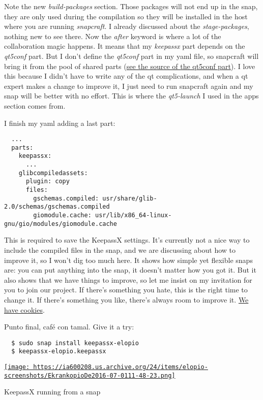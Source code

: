 \documentclass[12pt]{article}
\begin{document}
Note the new \emph{build-packages} section. Those packages will not end up in
the snap, they are only used during the compilation so they will be installed
in the host where you are running \emph{snapcraft}. I already discussed about
the \emph{stage-packages}, nothing new to see there. Now the \emph{after}
keyword is where a lot of the collaboration magic happens. It means that my
\emph{keepassx} part depends on the \emph{qt5conf} part. But I don't define the
\emph{qt5conf} part in my yaml file, so snapcraft will bring it from the pool
of shared parts
(\href{https://github.com/dplanella/qt5conf}
{see the source of the qt5conf part}). I love this because I didn't have to
write any of the qt complications, and when a qt expert makes a change to
improve it, I just need to run snapcraft again and my snap will be better with
no effort. This is where the \emph{qt5-launch} I used in the apps section comes
from.

I finish my yaml adding a last part:

\begin{verbatim}
  ...
  parts:
    keepassx:
      ...
    glibcompiledassets:
      plugin: copy
      files:
        gschemas.compiled: usr/share/glib-2.0/schemas/gschemas.compiled
        giomodule.cache: usr/lib/x86_64-linux-gnu/gio/modules/giomodule.cache
\end{verbatim}

This is required to save the KeepassX settings. It's currently not a nice way
to include the compiled files in the snap, and we are discussing about how to
improve it, so I won't dig too much here. It shows how simple yet flexible snaps
are: you can put anything into the snap, it doesn't matter how you got it. But
it also shows that we have things to improve, so let me insist on my invitation
for you to join our project. If there's something you hate, this is the right
time to change it. If there's something you like, there's always room to improve
it.
\href{http://media-cache-ak0.pinimg.com/736x/d7/cf/6e/d7cf6e3ec423dd7a02cc70a0aba8d99d.jpg}
{We have cookies}.

Punto final, café con tamal. Give it a try:

\begin{verbatim}
  $ sudo snap install keepassx-elopio
  $ keepassx-elopio.keepassx
\end{verbatim}

\begin{center}
  \href{
    https://ia600208.us.archive.org/24/items/elopio-screenshots/EkrankopioDe2016-07-0111-48-23.png}{
    \texttt{[image: 
      https://ia600208.us.archive.org/24/items/elopio-screenshots/EkrankopioDe2016-07-0111-48-23.png]}
  }
  \caption{KeepassX running from a snap}
\end{center}
\end{document}

